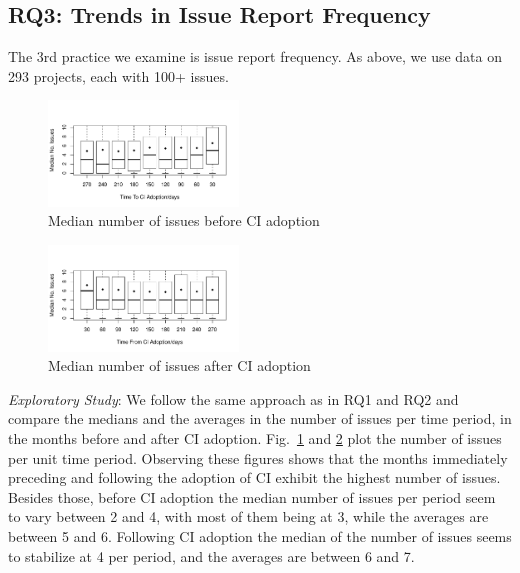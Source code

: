 


\subsection{RQ3: Trends in Issue Report Frequency}

The 3rd practice we examine is issue report frequency.
As above, we use data on 293 projects, each with 
100+ issues.

\begin{figure}[t]
\centering
\includegraphics[width=0.45\textwidth, clip=true, trim=0 15 15 50]{issues_before.pdf}
\caption{Median number of issues before CI adoption}
\label{Fig:IssuesBefore}
\end{figure}


\begin{figure}[t]
\centering
\includegraphics[width=0.45\textwidth, clip=true, trim=0 15 15 50]{issues_after.pdf}
\caption{Median number of issues after CI adoption}
\label{Fig:IssuesAfter}
\end{figure}

\smallskip\noindent \emph{Exploratory Study}:
We follow the same approach as in RQ1 and RQ2 and compare the 
medians and the averages in the number of issues per time period, in the 
months before and after CI adoption.
Fig.~\ref{Fig:IssuesBefore} and \ref{Fig:IssuesAfter} plot the number of 
issues per unit time period.
Observing these figures shows that the months immediately preceding 
and following the adoption of CI exhibit the highest number of issues.
Besides those, before CI adoption the median number of issues per period seem to vary between 2 and 4, with most of them being at 3, while the averages are between 5 and 6.
Following CI adoption the median of the number of issues seems to 
stabilize at 4 per period, and the averages are between 6 and 7.

